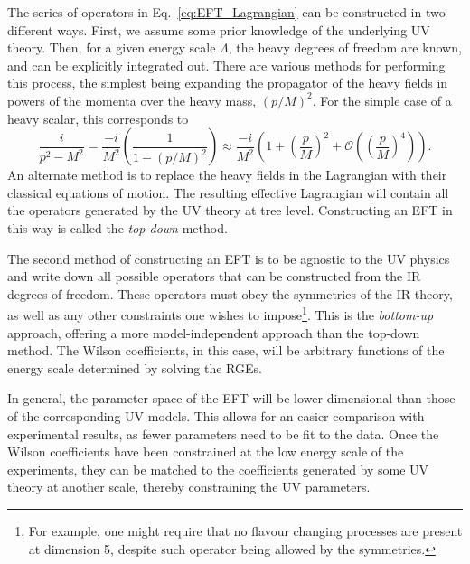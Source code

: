 The series of operators in Eq.~\ref{eq:EFT_Lagrangian} can be constructed in two different ways. First, we assume some prior knowledge of the underlying UV theory. Then, for a given energy scale $\Lambda$, the heavy degrees of freedom are known, and can be explicitly integrated out. There are various methods for performing this process, the simplest being expanding the propagator of the heavy fields in powers of the momenta over the heavy mass, $(p/M)^2$. For the simple case of a heavy scalar, this corresponds to 
\begin{equation}
    \frac{i}{p^2 - M^2} = \frac{-i}{M^2}\left(\frac{1}{1 - (p/M)^2}\right)\approx \frac{-i}{M^2}\left( 1 + \left(\frac{p}{M}\right)^2 + \mathcal{O}\left(\left(\frac{p}{M}\right)^4\right)\right).
\end{equation}
An alternate method is to replace the heavy fields in the Lagrangian with their classical equations of motion. The resulting effective Lagrangian will contain all the operators generated by the UV theory at tree level.
Constructing an EFT in this way is called the \textit{top-down} method.

The second method of constructing an EFT is to be agnostic to the UV physics and write down all possible operators that can be constructed from the IR degrees of freedom. These operators must obey the symmetries of the IR theory, as well as any other constraints one wishes to impose\footnote{For example, one might require that no flavour changing processes are present at dimension 5, despite such operator being allowed by the symmetries.}. This is the \textit{bottom-up} approach, offering a more model-independent approach than the top-down method. The Wilson coefficients, in this case, will be arbitrary functions of the energy scale determined by solving the RGEs.

In general, the parameter space of the EFT will be lower dimensional than those of the corresponding UV models. This allows for an easier comparison with experimental results, as fewer parameters need to be fit to the data. Once the Wilson coefficients have been constrained at the low energy scale of the experiments, they can be matched to the coefficients generated by some UV theory at another scale, thereby constraining the UV parameters. 

